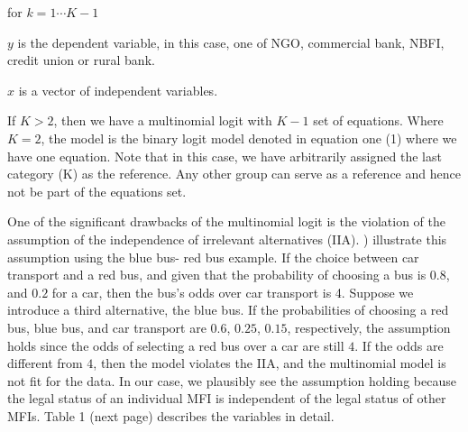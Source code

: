 \documentclass[a4paper,nobind]{templates/ociamthesis}
\begin{document}
for \(k = 1 \cdots K-1\)

\(y\) is the dependent variable, in this case, one of NGO, commercial bank, NBFI, credit union or rural bank.

\(x\) is a vector of independent variables.

If \(K>2\), then we have a multinomial logit with \(K-1\) set of equations. Where \(K=2\), the model is the binary logit model denoted in equation one (1) where we have one equation. Note that in this case, we have arbitrarily assigned the last category (K) as the reference. Any other group can serve as a reference and hence not be part of the equations set.

One of the significant drawbacks of the multinomial logit is the violation of the assumption of the independence of irrelevant alternatives (IIA). \textcite{cheng2007testing} ) illustrate this assumption using the blue bus- red bus example. If the choice between car transport and a red bus, and given that the probability of choosing a bus is \(0.8\), and \(0.2\) for a car, then the bus's odds over car transport is 4. Suppose we introduce a third alternative, the blue bus. If the probabilities of choosing a red bus, blue bus, and car transport are \(0.6\), \(0.25\), \(0.15\), respectively, the assumption holds since the odds of selecting a red bus over a car are still \(4\). If the odds are different from \(4\), then the model violates the IIA, and the multinomial model is not fit for the data. In our case, we plausibly see the assumption holding because the legal status of an individual MFI is independent of the legal status of other MFIs. Table 1 (next page) describes the variables in detail.
\end{document}
